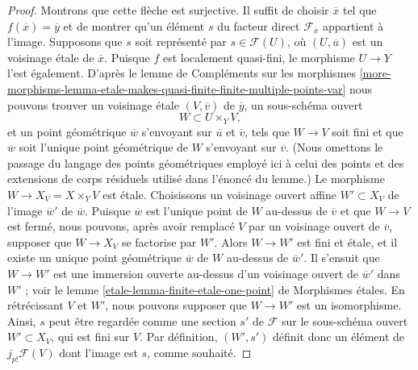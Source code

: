 \begin{proof}
\medskip\noindent
Montrons que cette flèche est surjective. Il suffit de choisir
$\overline{x}$ tel que $f(\overline{x}) = \overline{y}$ et de montrer qu'un
élément $s$ du facteur direct $\mathcal{F}_{\overline{x}}$ appartient à
l'image. Supposons que $s$ soit représenté par $s \in \mathcal{F}(U)$,
où $(U, \overline{u})$ est un voisinage étale de $\overline{x}$.
Puisque $f$ est localement quasi-fini, le morphisme $U \to Y$
l'est également. D'après le lemme de Compléments sur les morphismes
\ref{more-morphisms-lemma-etale-makes-quasi-finite-finite-multiple-points-var}
nous pouvons trouver un voisinage étale $(V, \overline{v})$ de
$\overline{y}$, un sous-schéma ouvert
$$
W \subset U \times_Y V,
$$
et un point géométrique $\overline{w}$ s'envoyant sur $\overline{u}$ et
$\overline{v}$, tels que $W \to V$ soit fini et que $\overline{w}$ soit l'unique
point géométrique de $W$ s'envoyant sur $\overline{v}$. (Nous omettons le passage
du langage des points géométriques employé ici à celui des points et des
extensions de corps résiduels utilisé dans
l'énoncé du lemme.) Le morphisme $W \to X_V = X \times_Y V$
est étale. Choisissons un voisinage ouvert affine $W' \subset X_V$
de l'image $\overline{w}'$ de $\overline{w}$. Puisque $\overline{w}$
est l'unique point de $W$ au-dessus de $\overline{v}$ et que $W \to V$
est fermé, nous pouvons, après avoir remplacé $V$ par un voisinage ouvert de $\overline{v}$,
supposer que $W \to X_V$ se factorise par $W'$. Alors $W \to W'$ est fini et
étale, et il existe un unique point géométrique $\overline{w}$ de $W$
au-dessus de $\overline{w}'$. Il s'ensuit que $W \to W'$ est une immersion ouverte
au-dessus d'un voisinage ouvert de $\overline{w}'$ dans $W'$ ; voir le
lemme \ref{etale-lemma-finite-etale-one-point} de Morphismes étales.
En rétrécissant $V$ et $W'$, nous pouvons supposer que $W \to W'$ est un isomorphisme.
Ainsi, $s$ peut être regardée comme une section $s'$ de $\mathcal{F}$ sur
le sous-schéma ouvert $W' \subset X_V$, qui est fini sur $V$.
Par définition, $(W', s')$ définit donc un élément de $j_{p!}\mathcal{F}(V)$
dont l'image est $s$, comme souhaité.


\end{proof}
